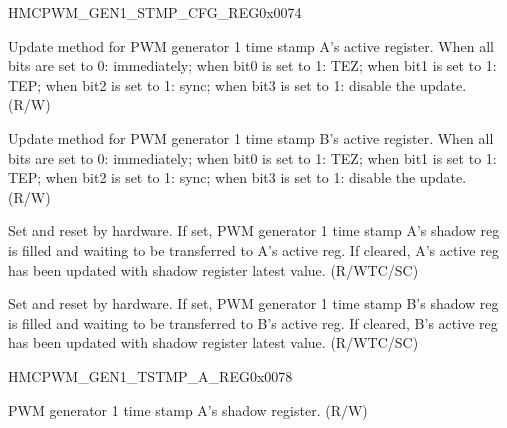 \begin{register}{H}{MCPWM\_GEN1\_STMP\_CFG\_REG}{0x{}0074}\label{regdesc:MCPWMGEN1STMPCFGREG}
%
%
%
%
%
\regnewline%
\begin{regdesc}\begin{reglist}
\label{fielddesc:MCPWMGEN1AUPMETHOD}\item [MCPWM\_GEN1\_A\_UPMETHOD] Update method for PWM generator 1 time stamp A's active register. When all bits are set to 0: immediately; when bit0 is set to 1: TEZ; when bit1 is set to 1: TEP; when bit2 is set to 1: sync; when bit3 is set to 1: disable the update. (R/W)
\label{fielddesc:MCPWMGEN1BUPMETHOD}\item [MCPWM\_GEN1\_B\_UPMETHOD] Update method for PWM generator 1 time stamp B's active register. When all bits are set to 0: immediately; when bit0 is set to 1: TEZ; when bit1 is set to 1: TEP; when bit2 is set to 1: sync; when bit3 is set to 1: disable the update. (R/W)
\label{fielddesc:MCPWMGEN1ASHDWFULL}\item [MCPWM\_GEN1\_A\_SHDW\_FULL] Set and reset by hardware. If set, PWM generator 1 time stamp A's shadow reg is filled and waiting to be transferred to A's active reg. If cleared, A's active reg has been updated with shadow register latest value. (R/WTC/SC)
\label{fielddesc:MCPWMGEN1BSHDWFULL}\item [MCPWM\_GEN1\_B\_SHDW\_FULL] Set and reset by hardware. If set, PWM generator 1 time stamp B's shadow reg is filled and waiting to be transferred to B's active reg. If cleared, B's active reg has been updated with shadow register latest value. (R/WTC/SC)
\end{reglist}\end{regdesc}
\end{register}


\begin{register}{H}{MCPWM\_GEN1\_TSTMP\_A\_REG}{0x{}0078}\label{regdesc:MCPWMGEN1TSTMPAREG}
%
%
\regnewline%
\begin{regdesc}\begin{reglist}
\label{fielddesc:MCPWMGEN1A}\item [MCPWM\_GEN1\_A] PWM generator 1 time stamp A's shadow register. (R/W)
\end{reglist}\end{regdesc}
\end{register}


